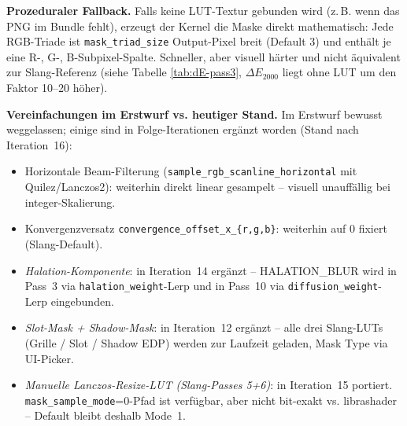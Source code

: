 \documentclass[11pt, a4paper]{article}
\begin{document}
\vspace{.5cm}
\textbf{Prozeduraler Fallback.} Falls keine LUT-Textur gebunden wird (z.\,B. wenn das PNG im Bundle fehlt), erzeugt der Kernel die Maske direkt mathematisch: Jede RGB-Triade ist \texttt{mask\_triad\_size} Output-Pixel breit (Default 3) und enth\"alt je eine R-, G-, B-Subpixel-Spalte. Schneller, aber visuell h\"arter und nicht \"aquivalent zur Slang-Referenz (siehe Tabelle \ref{tab:dE-pass3}, $\Delta E_{2000}$ liegt ohne LUT um den Faktor 10--20 h\"oher).

\vspace{.5cm}
\textbf{Vereinfachungen im Erstwurf vs. heutiger Stand.} Im Erstwurf bewusst weggelassen; einige sind in Folge-Iterationen erg\"anzt worden (Stand nach Iteration~16):
\begin{itemize}[leftmargin=*, nosep]
    \item Horizontale Beam-Filterung (\texttt{sample\_rgb\_scanline\_horizontal} mit Quilez/Lanczos2): weiterhin direkt linear gesampelt -- visuell unauff\"allig bei integer-Skalierung.
    \item Konvergenzversatz \texttt{convergence\_offset\_x\_\{r,g,b\}}: weiterhin auf 0 fixiert (Slang-Default).
    \item \emph{Halation-Komponente}: in Iteration~14 erg\"anzt -- HALATION\_BLUR wird in Pass~3 via \texttt{halation\_weight}-Lerp und in Pass~10 via \texttt{diffusion\_weight}-Lerp eingebunden.
    \item \emph{Slot-Mask + Shadow-Mask}: in Iteration~12 erg\"anzt -- alle drei Slang-LUTs (Grille / Slot / Shadow EDP) werden zur Laufzeit geladen, Mask Type via UI-Picker.
    \item \emph{Manuelle Lanczos-Resize-LUT (Slang-Passes 5+6)}: in Iteration~15 portiert. \texttt{mask\_sample\_mode}=0-Pfad ist verf\"ugbar, aber nicht bit-exakt vs. librashader -- Default bleibt deshalb Mode~1.
\end{itemize}
\end{document}
